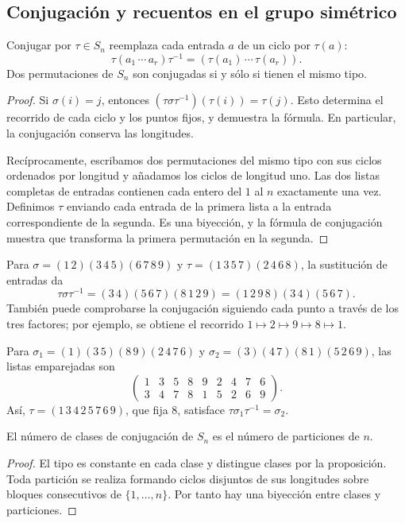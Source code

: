 \subsection{Conjugación y recuentos en el grupo simétrico}
\begin{prop}\label{prop:C9-conjugacion}
Conjugar por $\tau\in S_n$ reemplaza cada entrada $a$ de un ciclo por $\tau(a)$:
\[
\tau(a_1\,\cdots\,a_r)\tau^{-1}
=(\tau(a_1)\,\cdots\,\tau(a_r)).
\]
Dos permutaciones de $S_n$ son conjugadas si y sólo si tienen el mismo tipo.
\end{prop}
\begin{proof}
Si $\sigma(i)=j$, entonces $(\tau\sigma\tau^{-1})(\tau(i))=\tau(j)$. Esto determina el recorrido de cada ciclo y los puntos fijos, y demuestra la fórmula. En particular, la conjugación conserva las longitudes.

Recíprocamente, escribamos dos permutaciones del mismo tipo con sus ciclos ordenados por longitud y añadamos los ciclos de longitud uno. Las dos listas completas de entradas contienen cada entero del $1$ al $n$ exactamente una vez. Definimos $\tau$ enviando cada entrada de la primera lista a la entrada correspondiente de la segunda. Es una biyección, y la fórmula de conjugación muestra que transforma la primera permutación en la segunda.
\end{proof}
\begin{ejem}
Para $\sigma=(1\,2)(3\,4\,5)(6\,7\,8\,9)$ y $\tau=(1\,3\,5\,7)(2\,4\,6\,8)$, la sustitución de entradas da
\[
\tau\sigma\tau^{-1}=(3\,4)(5\,6\,7)(8\,1\,2\,9)
=(1\,2\,9\,8)(3\,4)(5\,6\,7).
\]
También puede comprobarse la conjugación siguiendo cada punto a través de los tres factores; por ejemplo, se obtiene el recorrido $1\mapsto2\mapsto9\mapsto8\mapsto1$.

Para $\sigma_1=(1)(3\,5)(8\,9)(2\,4\,7\,6)$ y $\sigma_2=(3)(4\,7)(8\,1)(5\,2\,6\,9)$, las listas emparejadas son
\[
\begin{pmatrix}1&3&5&8&9&2&4&7&6\\3&4&7&8&1&5&2&6&9\end{pmatrix}.
\]
Así, $\tau=(1\,3\,4\,2\,5\,7\,6\,9)$, que fija $8$, satisface $\tau\sigma_1\tau^{-1}=\sigma_2$.
\end{ejem}
\begin{coro}
El número de clases de conjugación de $S_n$ es el número de particiones de $n$.
\end{coro}
\begin{proof}
El tipo es constante en cada clase y distingue clases por la proposición. Toda partición se realiza formando ciclos disjuntos de sus longitudes sobre bloques consecutivos de $\{1,\ldots,n\}$. Por tanto hay una biyección entre clases y particiones.
\end{proof}

